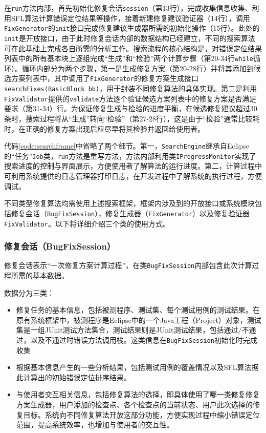 在\texttt{run}方法内部，首先初始化修复会话\texttt{session}（第13行），完成收集信息收集、利用SFL算法计算错误定位结果等操作，接着新建修复建议验证器（14行），调用\texttt{FixGenerator}的\texttt{init}接口完成修复建议生成器所需的初始化操作（15行）。此处的\texttt{init}是开放接口，由于此时修复会话内部的数据结构已经建立，不同的搜索算法可在此基础上完成各自所需的分析工作。搜索流程的核心结构是，对错误定位结果列表中的所有基本块上逐组完成“生成”和“检验”两个计算步骤（第20-34行\texttt{while}循环）。循环内部分为两个步骤，第一是生成修复方案（第20-28行）并将其添加到候选方案列表中，其中调用了\texttt{FixGenerator}的修复方案生成接口\texttt{searchFixes(BasicBlock bb)}，用于封装不同修复算法的具体实现。第二是利用\texttt{FixValidator}提供的\texttt{validate}方法逐个验证候选方案列表中的修复方案是否满足要求（第31-34）行。为保证修复生成与检验的进度平衡，在候选修复建议超过30条时，搜索过程将从“生成”转向“检验”（第27-28行），这是由于“检验”通常比较耗时，在正确的修复方案出现后应尽早将其检验并返回给使用者。

代码\ref{code:searchframe}中省略了两个细节。第一，\texttt{SearchEngine}继承自Eclipse的“任务”\texttt{Job}类，\texttt{run}方法是重写方法，方法内部利用类\texttt{IProgressMonitor}实现了搜索进度的控制与界面展示，方便使用者了解算法的运行进度。第二，计算过程中可利用系统提供的日志管理器打印日志，在开发过程中了解系统的执行过程，方便调试。

不同类型修复算法均需使用上述搜索框架，框架内涉及到的开放接口或系统模块包括修复会话（\texttt{BugFixSession}），修复生成器（\texttt{FixGenerator}）以及修复验证器\texttt{FixValidator}。以下将详细介绍三个类的使用方式。

\subsubsection{修复会话（BugFixSession）}%
修复会话表示“一次修复方案计算过程”，在类\texttt{BugFixSession}内部包含此次计算过程所需的基本数据。

数据分为三类：
\begin{itemize}
	\item 修复任务的基本信息，包括被测程序、测试集、每个测试用例的测试结果。在原有系统框架中，被测程序是Eclipse中的一个Java工程（Project）对象，测试集是一组JUnit测试方法集合，测试结果则是JUnit测试结果，包括通过/不通过，以及不通过时错误方法调用栈。这类信息在\texttt{BugFixSession}初始化时完成收集
	\item 根据基本信息产生的一些分析结果，包括测试用例的覆盖情况以及SFL算法据此计算出的初始错误定位排序结果。
	\item 与使用者交互相关信息，包括修复算法的选择，即具体使用了哪一类修复修复方案生成器，用户添加的检查点、各个检查点的当前状态、用户此次选择的修复目标。系统向不同修复算法开放这部分功能，方便实现过程中缩小错误定位范围，提高系统效率，也增加与使用者的交互性。
\end{itemize}

